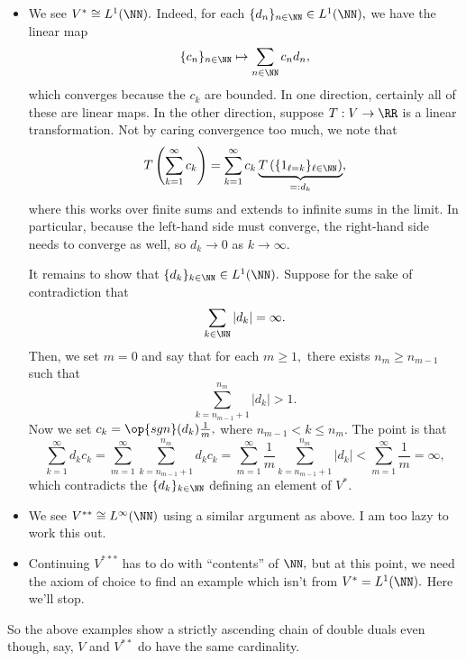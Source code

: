 \documentclass[../notes.tex]{subfiles}
\begin{document}
\begin{itemize}
	\item We see $V^*\cong L^1(\NN).$ Indeed, for each $\{d_n\}_{n\in\NN}\in L^1(\NN),$ we have the linear map
	\[\{c_n\}_{n\in\NN}\mapsto\sum_{n\in\NN}c_nd_n,\]
	which converges because the $c_k$ are bounded. In one direction, certainly all of these are linear maps. In the other direction, suppose $T:V\to\RR$ is a linear transformation. Not by caring convergence too much, we note that
	\[T\left(\sum_{k=1}^\infty c_k\right)=\sum_{k=1}^\infty c_k\underbrace{T\left(\{1_{\ell=k}\}_{\ell\in\NN}\right)}_{=:d_k},\]
	where this works over finite sums and extends to infinite sums in the limit. In particular, because the left-hand side must converge, the right-hand side needs to converge as well, so $d_k\to0$ as $k\to\infty.$

	It remains to show that $\{d_k\}_{k\in\NN}\in L^1(\NN).$ Suppose for the sake of contradiction that
	\[\sum_{k\in\NN}|d_k|=\infty.\]
	Then,  we set $m=0$ and say that for each $m\ge1,$ there exists $n_m\ge n_{m-1}$ such that
	\[\sum_{k=n_{m-1}+1}^{n_m}|d_k|>1.\]
	Now we set $c_k=\op{sgn}(d_k)\frac1m,$ where $n_{m-1}<k\le n_m.$ The point is that
	\[\sum_{k=1}^\infty d_kc_k=\sum_{m=1}^\infty\sum_{k=n_{m-1}+1}^{n_m}d_kc_k=\sum_{m=1}^\infty\frac1m\sum_{k=n_{m-1}+1}^{n_m}|d_k|<\sum_{m=1}^\infty\frac1m=\infty,\]
	which contradicts the $\{d_k\}_{k\in\NN}$ defining an element of $V^*.$
	\item We see $V^{**}\cong L^\infty(\NN)$ using a similar argument as above. I am too lazy to work this out.

	\item Continuing $V^{***}$ has to do with ``contents'' of $\NN,$ but at this point, we need the axiom of choice to find an example which isn't from $V^*=L^1(\NN).$ Here we'll stop.
\end{itemize}
So the above examples show a strictly ascending chain of double duals even though, say, $V$ and $V^{**}$ do have the same cardinality.
\end{document}
